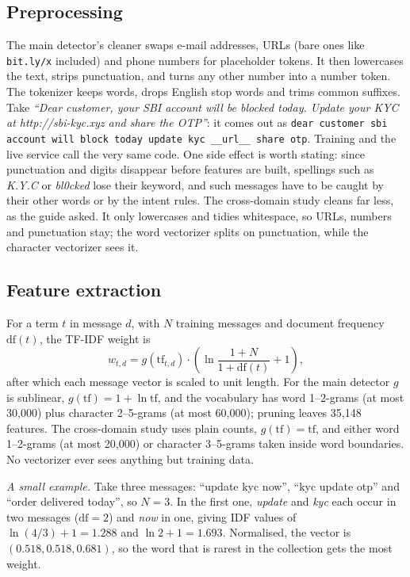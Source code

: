 \subsection{Preprocessing}
The main detector's cleaner swaps e-mail addresses, URLs (bare ones like \texttt{bit.ly/x} included) and phone numbers for placeholder tokens. It then lowercases the text, strips punctuation, and turns any other number into a number token. The tokenizer keeps words, drops English stop words and trims common suffixes. Take \textit{``Dear customer, your SBI account will be blocked today. Update your KYC at http://sbi-kyc.xyz and share the OTP''}: it comes out as \texttt{dear customer sbi account will block today update kyc \_\_url\_\_ share otp}. Training and the live service call the very same code. One side effect is worth stating: since punctuation and digits disappear before features are built, spellings such as \textit{K.Y.C} or \textit{bl0cked} lose their keyword, and such messages have to be caught by their other words or by the intent rules. The cross-domain study cleans far less, as the guide asked. It only lowercases and tidies whitespace, so URLs, numbers and punctuation stay; the word vectorizer splits on punctuation, while the character vectorizer sees it.

\subsection{Feature extraction}
For a term $t$ in message $d$, with $N$ training messages and document frequency $\mathrm{df}(t)$, the TF-IDF weight is
\begin{equation}
w_{t,d}=g(\mathrm{tf}_{t,d})\cdot\left(\ln\frac{1+N}{1+\mathrm{df}(t)}+1\right),
\end{equation}
after which each message vector is scaled to unit length. For the main detector $g$ is sublinear, $g(\mathrm{tf})=1+\ln\mathrm{tf}$, and the vocabulary has word 1--2-grams (at most 30,000) plus character 2--5-grams (at most 60,000); pruning leaves 35,148 features. The cross-domain study uses plain counts, $g(\mathrm{tf})=\mathrm{tf}$, and either word 1--2-grams (at most 20,000) or character 3--5-grams taken inside word boundaries. No vectorizer ever sees anything but training data.

\textit{A small example.} Take three messages: ``update kyc now'', ``kyc update otp'' and ``order delivered today'', so $N=3$. In the first one, \textit{update} and \textit{kyc} each occur in two messages ($\mathrm{df}=2$) and \textit{now} in one, giving IDF values of $\ln(4/3)+1=1.288$ and $\ln 2+1=1.693$. Normalised, the vector is $(0.518, 0.518, 0.681)$, so the word that is rarest in the collection gets the most weight.

